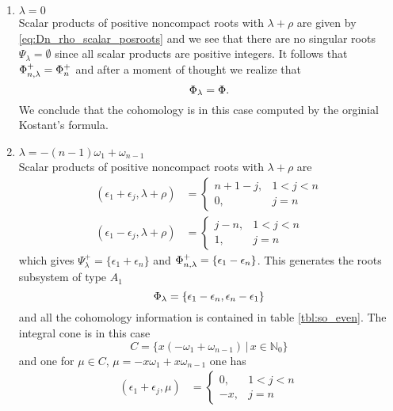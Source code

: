 \begin{enumerate}
 \item $ \lambda = 0$\\
  Scalar products of positive noncompact roots with $\lambda+\rho$ are given by \eqref{eq:Dn_rho_scalar_posroots} and we see that there are no singular roots $\Psi_\lambda = \emptyset$ since all scalar products are positive integers. It follows that $\Phi^+_{n,\lambda} = \Phi^+_n$ and after a moment of thought we realize that 
  \[
   \Phi_\lambda = \Phi.
  \]
  We conclude that the cohomology is in this case computed by the orginial Kostant's formula. %
  
 \item $ \lambda = -(n-1)\omega_1  + \omega_{n-1}$\\
  Scalar products of positive noncompact roots with $\lambda+\rho$ are
  \begin{align*}
    (\epsilon_1 + \epsilon_j, \lambda+\rho) & = \begin{cases}
                                                 n+1-j, & 1<j < n \\
                                                 0, & j = n
                                                \end{cases}\\
    (\epsilon_1 - \epsilon_j, \lambda+\rho) & = \begin{cases}
                                                j-n, & 1<j < n \\
                                                 1, & j = n
                                                \end{cases}
  \end{align*}
  which gives $\Psi^+_\lambda = \{\epsilon_1 +\epsilon_n \}$ and $\Phi^+_{n,\lambda} = \{\epsilon_1 - \epsilon_n \}$. This generates the roots subsystem of type $A_1$
  \[
   \Phi_\lambda = \{ \epsilon_1 - \epsilon_n, \epsilon_n - \epsilon_1 \}
  \]
  and all the cohomology information is contained in table \ref{tbl:so_even}. The integral cone is in this case \[C = \{x(-\omega_1 + \omega_{n-1}) \,|\, x\in\mathbb{N}_0 \}\] and one for $\mu  \in C$, $\mu = -x\omega_1 + x\omega_{n-1}$ one has
  \begin{align*}
    (\epsilon_1 + \epsilon_j, \mu) & = \begin{cases}
                                                 0, & 1<j < n \\
                                                 -x, & j = n

\end{cases}
\end{align*}
\end{enumerate}
